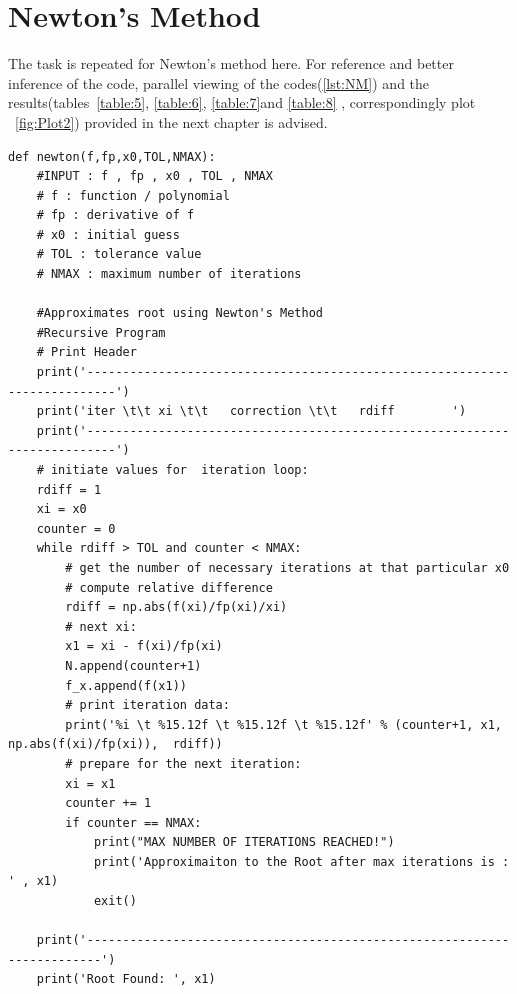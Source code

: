 \documentclass[a4paper, 12pt]{report}
\begin{document}
\section{Newton's Method}
The task is repeated for Newton's method here. For reference and better inference of the code, parallel viewing of the codes(\ref{lst:NM}) and the results(tables~\ref{table:5}, \ref{table:6}, \ref{table:7}and \ref{table:8} , correspondingly plot ~\ref{fig:Plot2}) provided in the next chapter is advised.
\begin{lstlisting}
def newton(f,fp,x0,TOL,NMAX):
    #INPUT : f , fp , x0 , TOL , NMAX
    # f : function / polynomial
    # fp : derivative of f
    # x0 : initial guess
    # TOL : tolerance value
    # NMAX : maximum number of iterations

    #Approximates root using Newton's Method
    #Recursive Program
    # Print Header
    print('--------------------------------------------------------------------------')
    print('iter \t\t xi \t\t   correction \t\t   rdiff        ')
    print('--------------------------------------------------------------------------')
    # initiate values for  iteration loop:
    rdiff = 1
    xi = x0
    counter = 0
    while rdiff > TOL and counter < NMAX:
        # get the number of necessary iterations at that particular x0
        # compute relative difference
        rdiff = np.abs(f(xi)/fp(xi)/xi)
        # next xi:
        x1 = xi - f(xi)/fp(xi)
        N.append(counter+1)
        f_x.append(f(x1))
        # print iteration data:
        print('%i \t %15.12f \t %15.12f \t %15.12f' % (counter+1, x1, np.abs(f(xi)/fp(xi)),  rdiff))
        # prepare for the next iteration:
        xi = x1
        counter += 1
        if counter == NMAX:
            print("MAX NUMBER OF ITERATIONS REACHED!")
            print('Approximaiton to the Root after max iterations is : ' , x1)        
            exit()
    
    print('------------------------------------------------------------------------')
    print('Root Found: ', x1)
\end{lstlisting}    
\end{document}
